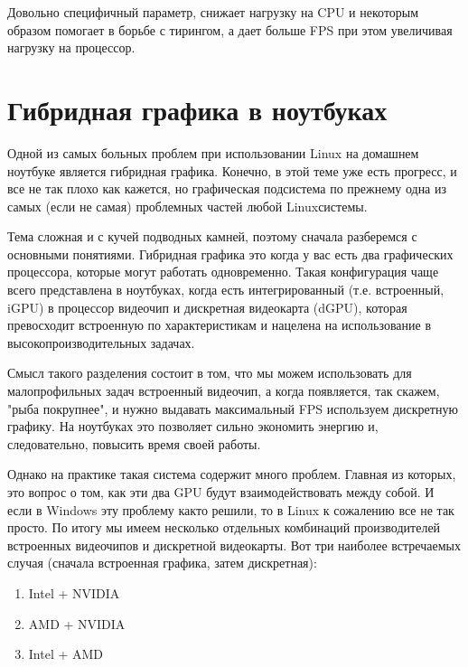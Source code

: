 \documentclass[letterpaper,10pt,russian,openany]{sphinxmanual}
\begin{document}
\sphinxAtStartPar
{}  \sphinxhyphen{} Довольно специфичный параметр,  \sphinxhyphen{} снижает нагрузку на CPU и некоторым образом помогает в борьбе с тирингом,
а  дает больше FPS при этом увеличивая нагрузку на процессор.

\ignorespaces 

\section{Гибридная графика в ноутбуках}
\label{\detokenize{source/first-steps:hybrid-graphics}}\label{\detokenize{source/first-steps:index-11}}\label{\detokenize{source/first-steps:id11}}
\sphinxAtStartPar
Одной из самых больных проблем при использовании Linux на домашнем ноутбуке является гибридная графика.
Конечно, в этой теме уже есть прогресс, и все не так плохо как кажется, но графическая подсистема по
прежнему одна из самых (если не самая) проблемных частей любой Linux\sphinxhyphen{}системы.

\sphinxAtStartPar
Тема сложная и с кучей подводных камней, поэтому сначала разберемся с основными понятиями.
Гибридная графика \sphinxhyphen{} это когда у вас есть два графических процессора, которые могут работать
одновременно. Такая конфигурация чаще всего представлена в ноутбуках, когда есть интегрированный
(т.е. встроенный, iGPU) в процессор видеочип и дискретная видеокарта (dGPU), которая
превосходит встроенную по характеристикам и нацелена на использование в высокопроизводительных
задачах.

\sphinxAtStartPar
Смысл такого разделения состоит в том, что мы можем использовать для малопрофильных задач встроенный видеочип,
а когда появляется, так скажем, "рыба покрупнее", и нужно выдавать максимальный FPS \sphinxhyphen{} используем дискретную графику.
На ноутбуках это позволяет сильно экономить энергию и, следовательно, повысить время своей работы.

\sphinxAtStartPar
Однако на практике такая система содержит много проблем. Главная из которых, это вопрос о том,
как эти два GPU будут взаимодействовать между собой. И если в Windows эту проблему как\sphinxhyphen{}то решили,
то в Linux к сожалению все не так просто. По итогу мы имеем несколько отдельных комбинаций
производителей встроенных видеочипов и дискретной видеокарты. Вот три наиболее встречаемых случая
(сначала встроенная графика, затем дискретная):
\begin{enumerate}
%
\item {} 
\sphinxAtStartPar
Intel + NVIDIA

\item {} 
\sphinxAtStartPar
AMD + NVIDIA

\item {} 
\sphinxAtStartPar
Intel + AMD

\end{enumerate}
\end{document}
